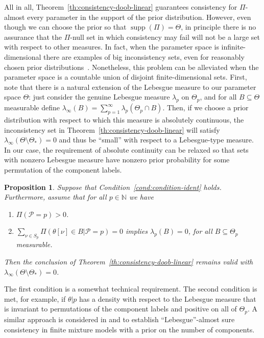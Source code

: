 \documentclass{article}
\numberwithin{equation}{section}
\theoremstyle{plain}
\newtheorem{proposition}[theorem]{Proposition}
\theoremstyle{definition}
\newcommand{\N}{\mathbb{N}}
\DeclareMathOperator{\supp} {supp}
\begin{document}
All in all, Theorem~\ref{th:consistency-doob-linear} guarantees consistency for \(\Pi\)-almost every parameter in the support of the prior distribution. However, even though we can choose the prior so that \(\supp( \Pi) = \Theta\), in principle there is no assurance that the \(\Pi\)-null set in which consistency may fail will not be a large set with respect to other measures. In fact, when the parameter space is infinite-dimensional there are examples of big inconsistency sets, even for reasonably chosen prior distributions~\citep{diaconis1986consistency}. Nonetheless, this problem can be alleviated when the parameter space is a countable union of disjoint finite-dimensional sets. First, note that there is a natural extension of the Lebesgue measure to our parameter space \(\Theta\): just consider the genuine Lebesgue measure \(\lambda_p\) on \(\Theta_p\), and for all \(B\subseteq \Theta\) measurable define \(\lambda_\infty(B) = \sum_{p=1}^\infty \lambda_p(\Theta_p \cap B)\). Then, if we choose a prior distribution with respect to which this measure is absolutely continuous, the inconsistency set in Theorem~\ref{th:consistency-doob-linear} will satisfy \(\lambda_\infty(\Theta \setminus \Theta_*)=0\) and thus be ``small'' with respect to a Lebesgue-type measure. In our case, the requirement of absolute continuity can be relaxed so that sets with nonzero Lebesgue measure have nonzero prior probability for some permutation of the component labels.

\begin{proposition}\label{prop:consistency-lebesgue-linear}
  Suppose that Condition~\ref{cond:condition-ident} holds. Furthermore, assume that for all \(p\in\N\) we have
  \begin{enumerate}[label=(\roman*)]
    \item \(\Pi(\mathcal P = p) > 0\).\label{cond:condition-lebesgue-1}
    \item \(\sum_{\nu\in S_p} \Pi(\theta[\nu] \in B|\mathcal P = p) = 0\) implies \(\lambda_p(B)=0\), for all \(B\subseteq \Theta_p\) measurable.\label{cond:condition-lebesgue-2}
  \end{enumerate}
  Then the conclusion of Theorem~\ref{th:consistency-doob-linear} remains valid with \(\lambda_\infty(\Theta \setminus \Theta_*)=0\).
\end{proposition}

The first condition is a somewhat technical requirement. The second condition is met, for example, if \(\theta| p\) has a density with respect to the Lebesgue measure that is invariant to permutations of the component labels and positive on all of \(\Theta_p\). A similar approach is considered in \citet{nobile1994bayesian} and \citet{miller2023consistency} to establish ``Lebesgue''-almost sure consistency in finite mixture models with a prior on the number of components.
\end{document}
